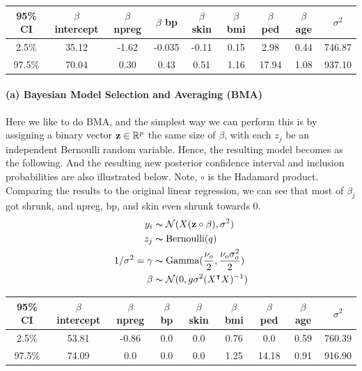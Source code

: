 \documentclass[11pt, letterpaper]{article}
\begin{document}
\begin{center}
\begin{tabular}{||c|c c c c c c c c||}
\hline
95\% CI & $\beta$ intercept & $\beta$ npreg & $\beta$ bp & $\beta$ skin & $\beta$ bmi & $\beta$ ped & $\beta$ age & $\sigma^2$ \\
\hline\hline
2.5\% & 35.12 & -1.62 &	-0.035 & -0.11 & 0.15 & 2.98 & 0.44 & 746.87 \\ 
97.5\% & 70.04 & 0.30 & 0.43 & 0.51 & 1.16 & 17.94 & 1.08 & 937.10 \\
\hline
\end{tabular}
\end{center}

\paragraph{(a) Bayesian Model Selection and Averaging (BMA)}
Here we like to do BMA, and the simplest way we can perform this is by assigning a binary vector $\bold{z} \in \mathbb{R}^p$ the same size of $\beta$, with each $z_j$ be an independent Bernoulli random variable. Hence, the resulting model becomes as the following. And the resulting new posterior confidence interval and inclusion probabilities are also illustrated below. Note, $\circ$ is the Hadamard product. Comparing the results to the original linear regression, we can see that most of $\beta_j$ got shrunk, and npreg, bp, and skin even shrunk towards 0.
\begin{align*}
    y_i &\thicksim \mathcal{N}(X(\bold{z} \circ \beta), \sigma^2) \\
    z_j &\thicksim \text{Bernoulli}(q) \\
    1/\sigma^2 = \gamma &\thicksim \text{Gamma}(\frac{\nu_o}{2}, \frac{\nu_o\sigma_o^2}{2}) \\
    \beta &\thicksim \mathcal{N}(0, g\sigma^2(X^{\intercal}X)^{-1})
\end{align*}

\begin{center}
\begin{tabular}{||c|c c c c c c c c||}
\hline
95\% CI & $\beta$ intercept & $\beta$ npreg & $\beta$ bp & $\beta$ skin & $\beta$ bmi & $\beta$ ped & $\beta$ age & $\sigma^2$ \\
\hline\hline
2.5\% & 53.81 & -0.86 & 0.0 & 0.0 & 0.76 & 0.0 & 0.59 & 760.39 \\ 
97.5\% & 74.09 & 0.0 & 0.0 & 0.0 & 1.25 & 14.18 & 0.91 & 916.90 \\
\hline
\end{tabular}
\end{center}
\end{document}
